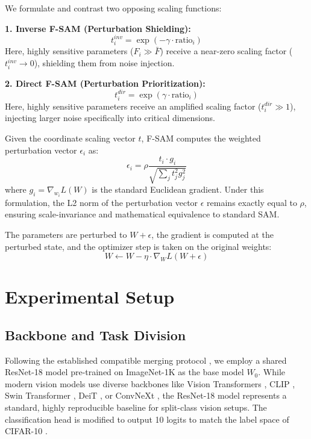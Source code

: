\documentclass{article}
\theoremstyle{plain}
\theoremstyle{definition}
\theoremstyle{remark}
\begin{document}
We formulate and contrast two opposing scaling functions:

\textbf{1. Inverse F-SAM (Perturbation Shielding):}
\begin{equation}
    t_i^{inv} = \exp\left(-\gamma \cdot \text{ratio}_i\right)
\end{equation}
Here, highly sensitive parameters ($F_i \gg \bar{F}$) receive a near-zero scaling factor ($t_i^{inv} \to 0$), shielding them from noise injection.

\textbf{2. Direct F-SAM (Perturbation Prioritization):}
\begin{equation}
    t_i^{dir} = \exp\left(\gamma \cdot \text{ratio}_i\right)
\end{equation}
Here, highly sensitive parameters receive an amplified scaling factor ($t_i^{dir} \gg 1$), injecting larger noise specifically into critical dimensions.

Given the coordinate scaling vector $t$, F-SAM computes the weighted perturbation vector $\epsilon_i$ as:
\begin{equation}
    \epsilon_i = \rho \frac{t_i \cdot g_i}{\sqrt{\sum_j t_j^2 g_j^2}}
\end{equation}
where $g_i = \nabla_{w_i} L(W)$ is the standard Euclidean gradient. Under this formulation, the L2 norm of the perturbation vector $\epsilon$ remains exactly equal to $\rho$, ensuring scale-invariance and mathematical equivalence to standard SAM.

The parameters are perturbed to $W + \epsilon$, the gradient is computed at the perturbed state, and the optimizer step is taken on the original weights:
\begin{equation}
    W \leftarrow W - \eta \cdot \nabla_W L(W + \epsilon)
\end{equation}

\section{Experimental Setup}
\label{sec:setup}

\subsection{Backbone and Task Division}
Following the established compatible merging protocol \cite{spor25}, we employ a shared ResNet-18 model \cite{he16} pre-trained on ImageNet-1K as the base model $W_0$. While modern vision models use diverse backbones like Vision Transformers \cite{dosovitskiy2020image}, CLIP \cite{radford2021learning}, Swin Transformer \cite{liu2021swin}, DeiT \cite{touvron2021training}, or ConvNeXt \cite{liu2022convnet}, the ResNet-18 model represents a standard, highly reproducible baseline for split-class vision setups. The classification head is modified to output 10 logits to match the label space of CIFAR-10 \cite{krizhevsky09}.
\end{document}
